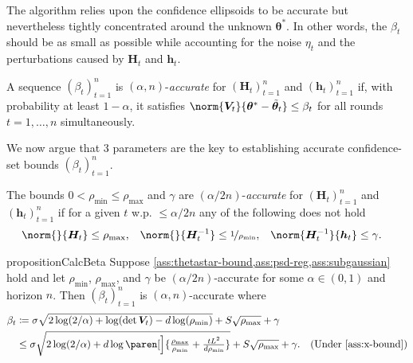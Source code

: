 \documentclass{article}
\renewcommand{\vec}[1]{\bm{#1}}
\newcommand{\defeq}{\coloneq}
\newcommand{\inv}[1]{#1^{-1}}
\renewcommand{\det}{\operatorname{det}}
\DeclarePairedDelimiter{\paren}()
\begin{document}
The algorithm relies upon the confidence ellipsoids to be accurate but
nevertheless tightly concentrated around the unknown $\vec\theta^*$.
In other words, the $\beta_t$ should be as small as possible while
accounting for the noise $\eta_t$ and the perturbations caused by
$\vec H_t$ and $\vec h_t$.

\begin{definition}\label{def:accurate-beta}
  A sequence $(\beta_t)_{t=1}^n$ is $(\alpha, n)$-\emph{accurate} for
  $(\vec H_t)_{t=1}^n$ and $(\vec h_t)_{t=1}^n$ if, with probability at
  least $1-\alpha$, it satisfies
  $\norm{\vec V_t}{\vec\theta^* - \tilde{\vec\theta}_t} \le \beta_t$
  for all rounds $t=1,\dotsc,n$ simultaneously.
\end{definition}

We now argue that 3 parameters are the key to establishing accurate confidence-set bounds $(\beta_t)_{t=1}^n$.

\begin{definition}\label{def:accurate-params}
  The bounds $0 < \rho_{\min} \le \rho_{\max}$ and $\gamma$ are
  $(\alpha/2n)$-\emph{accurate} for $(\vec H_t)_{t=1}^n$ and $(\vec h_t)_{t=1}^n$ if for a given $t$ w.p. $\leq \alpha/2n$ any of the following does not hold
  \begin{align*}
    \norm{}{\vec H_t} &\le \rho_{\max},
    &\norm{}{\inv{\vec H_t}} &\le \nicefrac{1}{\rho_{\min}},
    &\norm{\inv{\vec H_t}}{\vec h_t} &\le \gamma.
  \end{align*}
\end{definition}

\begin{restatable}{proposition}{CalcBeta}%
  \label{prop:calc-beta}
  Suppose
  \cref{ass:thetastar-bound,ass:psd-reg,ass:subgaussian}
  hold and let $\rho_{\min}$, $\rho_{\max}$, and $\gamma$ be
  $(\alpha/2n)$-accurate for some $\alpha\in(0,1)$ and horizon $n$.
  Then $(\beta_t)_{t=1}^n$ is $(\alpha,n)$-accurate where
  \begin{align*}
    \beta_t
    &\defeq \sigma\sqrt{2\log(2/\alpha) + \log(\det \vec V_t) - d\log(\rho_{\min})}
      + S\sqrt{\rho_{\max}} + \gamma \\
    &\le \sigma\sqrt{2\log({2}/{\alpha}) + d\log\paren[\Big]{\tfrac{\rho_{\max}}{\rho_{\min}}
      + \tfrac{tL^2}{d\rho_{\min}}}}
      + S\sqrt{\rho_{\max}} + \gamma.
    &\text{(Under \cref{ass:x-bound})}
  \end{align*}
\end{restatable}
\end{document}
